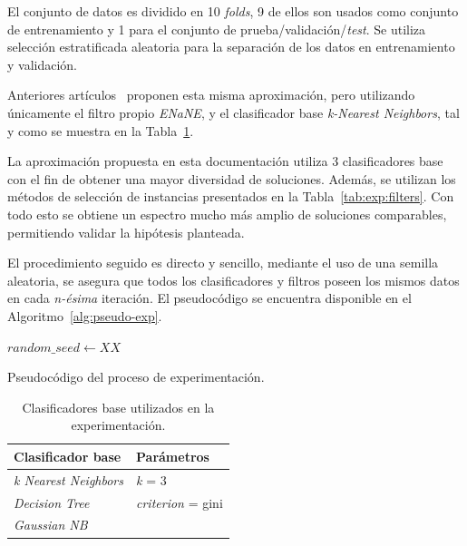 El conjunto de datos es dividido en 10 \textit{folds}, 9 de ellos son usados como conjunto de entrenamiento y 1 para el conjunto de prueba/validación/\textit{test}. Se utiliza selección estratificada aleatoria para la separación de los datos en entrenamiento y validación.

Anteriores artículos~\cite{li2019selfk} proponen esta misma aproximación, pero utilizando únicamente el filtro propio \emph{ENaNE}, y el clasificador base \textit{k-Nearest Neighbors}, tal y como se muestra en la Tabla~\ref{tab:exp:classifiers}.

La aproximación propuesta en esta documentación utiliza 3 clasificadores base con el fin de obtener una mayor diversidad de soluciones. Además, se utilizan los métodos de selección de instancias presentados en la Tabla~\ref{tab:exp:filters}.
Con todo esto se obtiene un espectro mucho más amplio de soluciones comparables, permitiendo validar la hipótesis planteada.

El  procedimiento seguido es directo y sencillo, mediante el uso de una semilla aleatoria, se asegura que todos los clasificadores y filtros poseen los mismos datos en cada \textit{n-ésima} iteración. El pseudocódigo se encuentra disponible en el Algoritmo~\ref{alg:pseudo-exp}.

\begin{algorithm}[]
  $random\_seed \leftarrow XX$\\
	\caption{Pseudocódigo del proceso de experimentación.}\label{alg:pseudo-exp}
\end{algorithm}

\begin{table}[]
    \centering
    \begin{tabular}{ll}
	\toprule
        \textbf{Clasificador base} & \textbf{Parámetros} \\ 
    \toprule
        \textit{k Nearest Neighbors} & \textit{k} = 3 \\
        \textit{Decision Tree} & \textit{criterion} = gini \\ 
        \textit{Gaussian NB} & ~ \\ 
    \bottomrule
    \end{tabular}
    \caption{Clasificadores base utilizados en la experimentación.}\label{tab:exp:classifiers}
\end{table}

